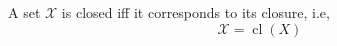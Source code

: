A set $\mathcal{X}$ is closed iff it corresponds to its closure, i.e,
$$\mathcal{X} = \operatorname{cl}(X)$$ 
